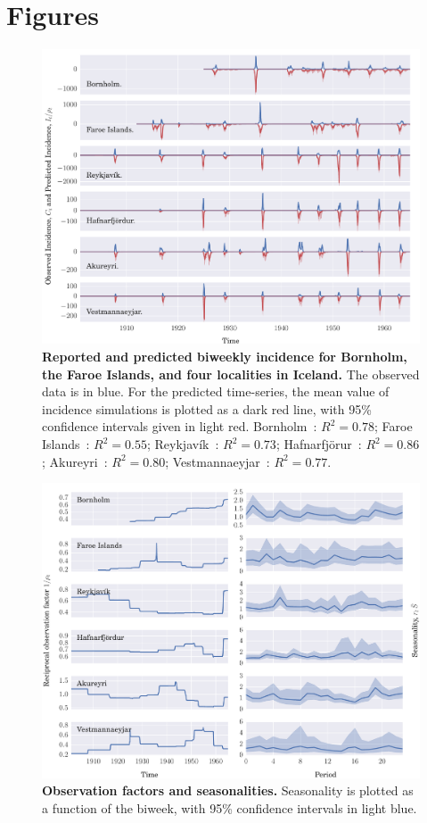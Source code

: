 \documentclass[10pt]{article}
\begin{document}
\section*{Figures}

\begin{figure}[!h]
\centering
\includegraphics[width=\textwidth]{figures/q1.pdf}
\caption{\textbf{Reported and predicted biweekly incidence for Bornholm, the Faroe Islands, and four localities in Iceland.} The observed data is in blue. For the predicted time-series, the mean value of incidence simulations is plotted as a dark red line, with 95\% confidence intervals given in light red. Bornholm~: $R^2=0.78$; Faroe Islands~: $R^2=0.55$; Reykjav\'{i}k~: $R^2=0.73$; Hafnarfj\"{o}r\dh{}ur~: $R^2=0.86$; Akureyri~: $R^2=0.80$; Vestmannaeyjar~: $R^2=0.77$.}
\label{figIncidence}
\end{figure}



\begin{figure}[!h]
\centering
\includegraphics[width=\textwidth]{figures/q2.pdf}
\caption{\textbf{Observation factors and seasonalities.} Seasonality is plotted as a function of the biweek, with 95\% confidence intervals in light blue.}
\label{figSims}
\end{figure}
\end{document}
